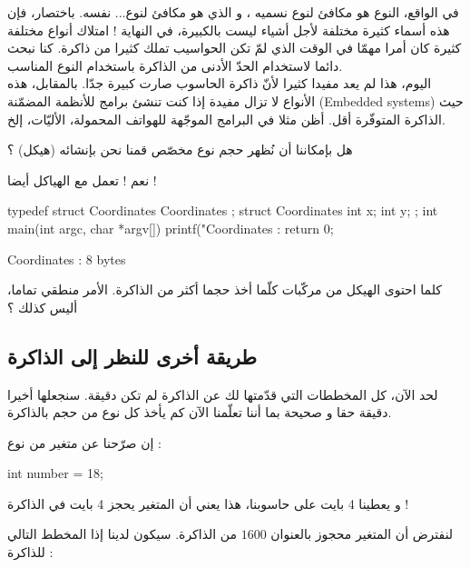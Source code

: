 \begin{information}
في الواقع، النوع
هو مكافئ لنوع نسميه
،
و الذي هو مكافئ لنوع...
نفسه. باختصار، فإن هذه أسماء كثيرة مختلفة لأجل أشياء ليست بالكبيرة، في النهاية ! امتلاك أنواع مختلفة كثيرة كان أمرا مهمّا  في الوقت الذي لمّ تكن الحواسيب تملك كثيرا من ذاكرة. كنا نبحث دائما لاستخدام الحدّ الأدنى من الذاكرة باستخدام النوع المناسب.\\
اليوم، هذا لم يعد مفيدا كثيرا لأنّ ذاكرة الحاسوب صارت كبيرة جدّا. بالمقابل، هذه الأنواع لا تزال مفيدة إذا كنت تنشئ برامج للأنظمة المضمّنة
(\textenglish{Embedded systems})
حيث الذاكرة المتوفّرة أقل. أظن مثلا في البرامج الموجّهة للهواتف المحمولة، الأليّات، إلخ.
\end{information}

\begin{question}
هل بإمكاننا أن نُظهر حجم نوع مخصّص قمنا نحن بإنشائه (هيكل) ؟
\end{question}

نعم !
تعمل مع الهياكل أيضا !

\begin{Csource}
typedef struct ِCoordinates ِCoordinates ;
struct ِCoordinates
{
	int x;
	int y;
};
int main(int argc, char *argv[])
{
	printf("ِCoordinates  : %
	return 0;
}
\end{Csource}

\begin{Console}
Coordinates : 8 bytes
\end{Console}

كلما احتوى الهيكل من مركّبات كلّما أخذ حجما أكثر من الذاكرة. الأمر منطقي تماما، أليس كذلك ؟

\subsection{طريقة أخرى للنظر إلى الذاكرة}
لحد الآن، كل المخططات التي قدّمتها لك عن الذاكرة لم تكن دقيقة. سنجعلها أخيرا دقيقة حقا و صحيحة بما أننا تعلّمنا الآن كم يأخذ كل نوع من حجم بالذاكرة.

إن صرّحنا عن متغير من نوع
 :

\begin{Csource}
int number = 18;
\end{Csource}

و
يعطينا 4 بايت على حاسوبنا، هذا يعني أن المتغير يحجز 4 بايت في الذاكرة !

لنفترض أن المتغير
محجوز بالعنوان
$1600$
من الذاكرة. سيكون لدينا إذا المخطط التالي للذاكرة :

